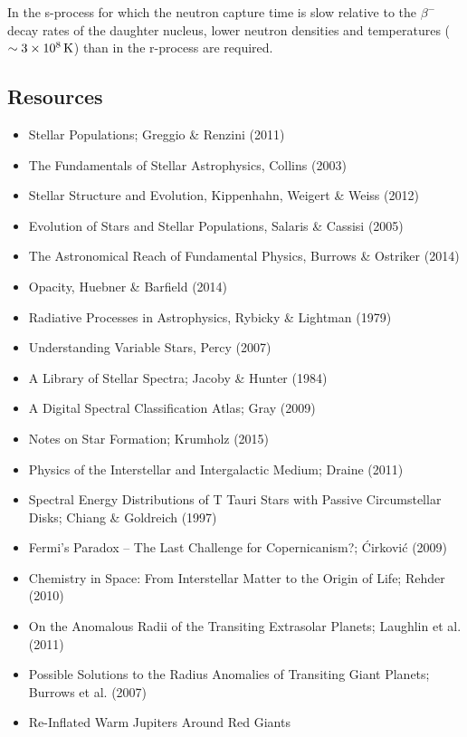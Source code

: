 \documentclass[a4paper,10pt]{article}
\begin{document}
{\noindent}In the s-process for which the neutron capture time is slow relative to the $\beta^-$ decay rates of the daughter nucleus, lower neutron densities and temperatures ($\sim3\times10^8\,{\rm K}$) than in the r-process are required.


\newpage
\subsection{Resources}

\begin{itemize}
    \item Stellar Populations; Greggio \& Renzini (2011)
    \item The Fundamentals of Stellar Astrophysics, Collins (2003)
    \item Stellar Structure and Evolution, Kippenhahn, Weigert \& Weiss (2012)
    \item Evolution of Stars and Stellar Populations, Salaris \& Cassisi (2005)
    \item The Astronomical Reach of Fundamental Physics, Burrows \& Ostriker (2014)
    \item Opacity, Huebner \& Barfield (2014)
    \item Radiative Processes in Astrophysics, Rybicky \& Lightman (1979)
    \item Understanding Variable Stars, Percy (2007)
    \item A Library of Stellar Spectra; Jacoby \& Hunter (1984)
    \item A Digital Spectral Classification Atlas; Gray (2009)
    \item Notes on Star Formation; Krumholz (2015)
    \item Physics of the Interstellar and Intergalactic Medium; Draine (2011)
    \item Spectral Energy Distributions of T Tauri Stars with Passive Circumstellar Disks; Chiang \& Goldreich (1997)
    \item Fermi’s Paradox -- The Last Challenge for Copernicanism?; \'Cirkovi\'c (2009)
    \item Chemistry in Space: From Interstellar Matter to the Origin of Life; Rehder (2010)
    \item On the Anomalous Radii of the Transiting Extrasolar Planets; Laughlin et al. (2011)
    \item Possible Solutions to the Radius Anomalies of Transiting Giant Planets; Burrows et al. (2007)
    \item Re-Inflated Warm Jupiters Around Red Giants
\end{itemize}
\end{document}
